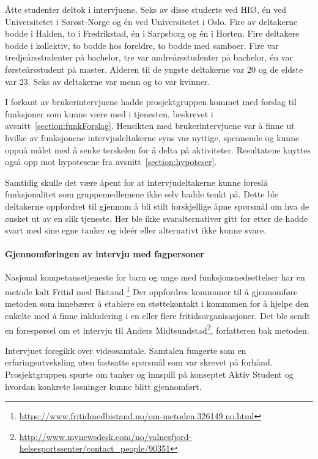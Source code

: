 Åtte studenter deltok i intervjuene. Seks av disse studerte ved HIØ, én ved Universitetet i Sørøst-Norge og én ved Universitetet i Oslo. Fire av deltakerne bodde i Halden, to i Fredrikstad, én i Sarpsborg og én i Horten. Fire deltakere bodde i kollektiv, to bodde hos foreldre, to bodde med samboer. Fire var tredjeårsstudenter på bachelor, tre var andreårsstudenter på bachelor, én var førsteårsstudent på master. Alderen til de yngste deltakerne var 20 og de eldste var 23. Seks av deltakerne var menn og to var kvinner.

I forkant av brukerintervjuene hadde prosjektgruppen kommet med forslag til funksjoner som kunne være med i tjenesten, beskrevet i avsnitt~\ref{section:funkForslag}. Hensikten med brukerintervjuene var å finne ut hvilke av funksjonene intervjudeltakerne syns var nyttige, spennende og kunne oppnå målet med å senke terskelen for å delta på aktiviteter. Resultatene knyttes også opp mot hypotesene fra avsnitt~\ref{section:hypoteser}.

Samtidig skulle det være åpent for at intervjudeltakerne kunne foreslå funksjonalitet som gruppemedlemene ikke selv hadde tenkt på. Dette ble deltakerne oppfordret til gjennom å bli stilt forskjellige åpne spørsmål om hva de ønsket ut av en slik tjeneste. Her ble ikke svaralternativer gitt før etter de hadde svart med sine egne tanker og ideér eller alternativt ikke kunne svare.

\paragraph{Gjennomføringen av intervju med fagpersoner}

Nasjonal kompetansetjeneste for barn og unge med funksjonsnedsettelser har en metode kalt Fritid med Bistand.\footnote{\url{https://www.fritidmedbistand.no/om-metoden.326149.no.html}} Der oppfordres kommuner til å gjennomføre metoden som innebærer å etablere en støttekontakt i kommunen for å hjelpe den enkelte med å finne inkludering i en eller flere fritidsorganisasjoner. Det ble sendt en forespørsel om et intervju til Anders Midtsundstad\footnote{\url{http://www.mynewsdesk.com/no/valnesfjord-helsesportssenter/contact_people/90351}}, forfatteren bak metoden.
 
Intervjuet foregikk over videosamtale. Samtalen fungerte som en erfaringsutveksling uten fastsatte spørsmål som var skrevet på forhånd. Prosjektgruppen spurte om tanker og innspill på konseptet Aktiv Student og hvordan konkrete løsninger kunne blitt gjennomført.

